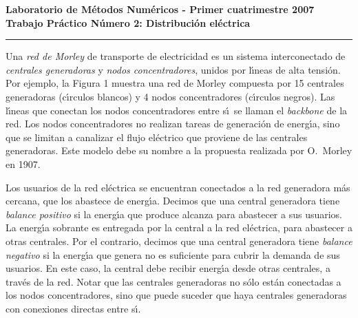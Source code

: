 

%

\begin{centering}
\bf Laboratorio de M\'etodos Num\'ericos - Primer cuatrimestre 2007 \\
\bf Trabajo Pr\'actico N\'umero 2: Distribuci\'on el\'ectrica \\
\end{centering}

\vskip 25pt
\hrule
\vskip 11pt

Una \emph{red de Morley} de transporte de electricidad es un sistema
interconectado de \emph{centrales generadoras} y \emph{nodos concentradores},
unidos por l\'\i neas de alta tensi\'on. Por ejemplo, la Figura 1
muestra una red de Morley compuesta por 15 centrales generadoras
(c\'\i rculos blancos) y 4 nodos concentradores (c\'\i rculos negros). Las
l\'\i neas que conectan los nodos concentradores entre s\'\i\ se llaman
el \emph{backbone} de la red. Los nodos concentradores no realizan tareas
de generaci\'on de energ\'\i a, sino que se limitan a canalizar el flujo
el\'ectrico que proviene de las centrales generadoras. Este modelo debe
su nombre a la propuesta realizada por O.~Morley en 1907.

Los usuarios de la red el\'ectrica se encuentran conectados a la red
generadora m\'as cercana, que los abastece de energ\'\i a. Decimos que una
central generadora tiene \emph{balance positivo} si la energ\'\i a que
produce alcanza para abastecer a sus usuarios. La energ\'\i a sobrante es
entregada por la central a la red el\'ectrica, para abastecer a otras
centrales. Por el contrario, decimos que una central generadora tiene
\emph{balance negativo} si la energ\'\i a que genera no es suficiente para
cubrir la demanda de sus usuarios. En este caso, la central debe recibir
energ\'\i a desde otras centrales, a trav\'es de la red. Notar que las
centrales generadoras no s\'olo est\'an conectadas a los nodos
concentradores, sino que puede suceder que haya centrales generadoras
con conexiones directas entre s\'\i.

